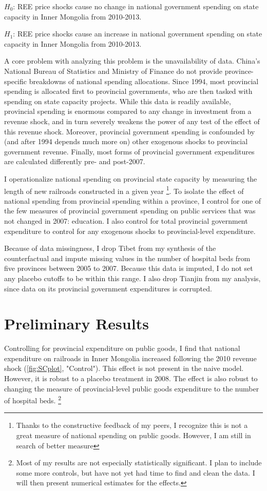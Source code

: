 \documentclass[bibtex,nonblind]{apsr_submission}
\begin{document}
$H_0$: REE price shocks cause no change in national government spending on state capacity in Inner Mongolia from 2010-2013.

$H_1$: REE price shocks cause an increase in national government spending on state capacity in Inner Mongolia from 2010-2013.

A core problem with analyzing this problem is the unavailability of data. China's National Bureau of Statistics and Ministry of Finance do not provide province-specific breakdowns of national spending allocations. Since 1994, most provincial spending is allocated first to provincial governments, who are then tasked with spending on state capacity projects. While this data is readily available, provincial spending is enormous compared to any change in investment from a revenue shock, and in turn severely weakens the power of any test of the effect of this revenue shock. Moreover, provincial government spending is confounded by (and after 1994 depends much more on) other exogenous shocks to provincial government revenue. Finally, most forms of provincial government expenditures are calculated differently pre- and post-2007.

I operationalize national spending on provincial state capacity by measuring the length of new railroads constructed in a given year \footnote{Thanks to the constructive feedback of my peers, I recognize this is not a great measure of national spending on public goods. However, I am still in search of better measure}. To isolate the effect of national spending from provincial spending within a province, I control for one of the few measures of provincial government spending on public services that was not changed in 2007: education. I also control for total provincial government expenditure to control for any exogenous shocks to provincial-level expenditure.

Because of data missingness, I drop Tibet from my synthesis of the counterfactual and impute missing values in the number of hospital beds from five provinces between 2005 to 2007. Because this data is imputed, I do not set any placebo cutoffs to be within this range. I also drop Tianjin from my analysis, since data on its provincial government expenditures is corrupted.

\section{Preliminary Results}

Controlling for provincial expenditure on public goods, I find that national expenditure on railroads in Inner Mongolia increased following the 2010 revenue shock (\ref{fig:SCplot}, "Control"). This effect is not present in the naive model. However, it is robust to a placebo treatment in 2008. The effect is also robust to changing the measure of provincial-level public goods expenditure to the number of hospital beds. \footnote{Most of my results are not especially statistically significant. I plan to include some more controls, but have not yet had time to find and clean the data. I will then present numerical estimates for the effects.}
\end{document}
